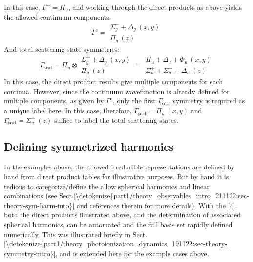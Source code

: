 \documentclass[letterpaper,table,10pt,english]{jupyterBook}
\begin{document}
\sphinxAtStartPar
In this case, \(\Gamma^{+} = \Pi_u\), and \sphinxhyphen{} working through the direct products as above \sphinxhyphen{} yields the allowed continuum components:
\label{equation:part2/sym-fitting-intro_220423:618c6e0e-88fa-4e7f-982c-3d3c951cc465}\begin{equation}
\Gamma^{e}=\begin{array}{c}
\Sigma_{g}^{+} + \Delta_{g}~(x,y)\\
\Pi_{g}~(z)
\end{array}
\end{equation}
\sphinxAtStartPar
And total scattering state symmetries:
\label{equation:part2/sym-fitting-intro_220423:eefaebb6-bc7d-4ce7-ac9c-68514c70d89a}\begin{equation}
\Gamma_{\mathrm{scat}}=\Pi_{u}\otimes\begin{array}{c}
\Sigma_{g}^{+} + \Delta_{g}~(x,y)\\
\Pi_{g}~(z)
\end{array}=\begin{array}{c}
\Pi_{u} + \Delta_{u} + \Phi_{u}~(x,y)\\
\Sigma_{u}^{+} + \Sigma_{u}^{-} + \Delta_{u}~(z)
\end{array}
\end{equation}
\sphinxAtStartPar
In this case, the direct product results give multiple components for each continua. However, since the continuum wavefunction is already defined for multiple components, as given by \(\Gamma^{e}\), only the first \(\Gamma_{\mathrm{scat}}\) symmetry is required as a unique label here. In this case, therefore, \(\Gamma_{\mathrm{scat}} = \Pi_{u}~(x,y)\) and \(\Gamma_{\mathrm{scat}} =\Sigma_{u}^{+}~(z)\) suffice to label the total scattering states.


\subsection{Defining symmetrized harmonics}
\label{\detokenize{part2/sym-fitting-intro_220423:defining-symmetrized-harmonics}}
\sphinxAtStartPar
In the examples above, the allowed irreducible representations are defined by hand from direct product tables for illustrative purposes. But \sphinxhyphen{} by hand \sphinxhyphen{} it is tedious to categorize/define the allow spherical harmonics and linear combinations (see \hyperref[\detokenize{part1/theory_observables_intro_211122:sec-theory-sym-harm-into}]{Sect.\@ \ref{\detokenize{part1/theory_observables_intro_211122:sec-theory-sym-harm-into}}} and references therein for more details). With the  {[}\hyperlink{cite.backmatter/bibliography:id618}{4}{]}, both the direct products illustrated above, and the determination of associated spherical harmonics, can be automated and the full basis set rapidly defined numerically. This was illustrated briefly in \hyperref[\detokenize{part1/theory_photoionization_dynamics_191122:sec-theory-symmetry-intro}]{Sect.\@ \ref{\detokenize{part1/theory_photoionization_dynamics_191122:sec-theory-symmetry-intro}}}, and is extended here for the example cases above.
\end{document}
